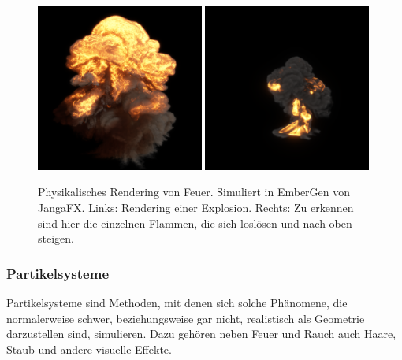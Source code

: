 \begin{figure}[h!]
	\includegraphics[width=0.49\textwidth]{Grafiken/Basics/Fire/explosion_0000.png}
	\includegraphics[width=0.49\textwidth]{Grafiken/Basics/Fire/explosion2_0000_0000.png}
	\centering
	\begin{footnotesize}
		\caption{Physikalisches Rendering von Feuer. Simuliert in EmberGen von JangaFX.  
			Links: Rendering einer Explosion. Rechts: Zu erkennen sind hier die einzelnen Flammen, die sich loslösen und nach oben steigen.}
		
		\label{fig:explosion}
	\end{footnotesize}
\end{figure}


\subsubsection{Partikelsysteme}
Partikelsysteme sind Methoden, mit denen sich solche Phänomene, die normalerweise schwer, beziehungsweise gar nicht, realistisch 
als Geometrie darzustellen sind, simulieren. Dazu gehören neben Feuer und Rauch auch Haare, Staub und andere visuelle Effekte.

